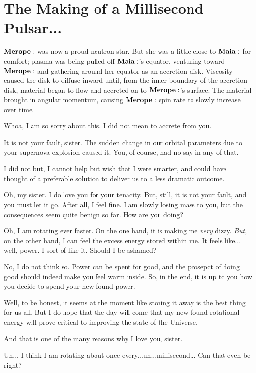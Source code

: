 \documentclass[main.tex]{subfiles}
\begin{document}
\section{The Making of a Millisecond Pulsar...}

$\Merope$ was now a proud neutron star.  But she was a little close to $\Maia$ for comfort; plasma was being pulled off $\Maia$'s equator, venturing toward $\Merope$ and gathering around her equator as an accretion disk.  Viscosity caused the disk to diffuse inward until, from the inner boundary of the accretion disk, material began to flow and accreted on to $\Merope$'s surface.  The material brought in angular momentum, causing $\Merope$ spin rate to slowly increase over time.

\Merope Whoa, I am so sorry about this.  I did not mean to accrete from you.

\Maia It is not your fault, sister.  The sudden change in our orbital parameters due to your supernova explosion caused it.  You, of course, had no say in any of that.

\Merope I did not but, I cannot help but wish that I were smarter, and could have thought of a preferable solution to deliver us to a less dramatic outcome.

\Maia Oh, my sister.  I do love you for your tenacity.  But, still, it is not your fault, and you must let it go.  After all, I feel fine.  I am slowly losing mass to you, but the consequences seem quite benign so far.  How are you doing?

\Merope Oh, I am rotating ever faster.  On the one hand, it is making me \textit{very} dizzy.  \textit{But}, on the other hand, I can feel the excess energy stored within me.  It feels like... well, power.  I sort of like it.  Should I be ashamed?

\Maia No, I do not think so.  Power can be spent for good, and the prosepct of doing good should indeed make you feel warm inside.  So, in the end, it is up to you how you decide to spend your new-found power.

\Merope  Well, to be honest, it seems at the moment like storing it away is the best thing for us all.  But I do hope that the day will come that my new-found rotational energy will prove critical to improving the state of the Universe.

\Maia And that is one of the many reasons why I love you, sister.  

\Merope Uh... I think I am rotating about once every...uh...millisecond... Can that even be right?
\end{document}
